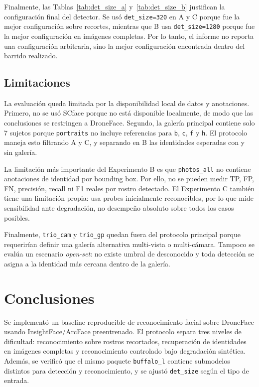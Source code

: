 \documentclass[11pt]{article}
\begin{document}
Finalmente, las Tablas~\ref{tab:det_size_a} y~\ref{tab:det_size_b} justifican la configuración final del detector. Se usó \texttt{det\_size=320} en A y C porque fue la mejor configuración sobre recortes, mientras que B usa \texttt{det\_size=1280} porque fue la mejor configuración en imágenes completas. Por lo tanto, el informe no reporta una configuración arbitraria, sino la mejor configuración encontrada dentro del barrido realizado.

\subsection{Limitaciones}

La evaluación queda limitada por la disponibilidad local de datos y anotaciones. Primero, no se usó SCface porque no está disponible localmente, de modo que las conclusiones se restringen a DroneFace. Segundo, la galería principal contiene solo 7 sujetos porque \texttt{portraits} no incluye referencias para \texttt{b}, \texttt{c}, \texttt{f} y \texttt{h}. El protocolo maneja esto filtrando A y C, y separando en B las identidades esperadas con y sin galería.

La limitación más importante del Experimento B es que \texttt{photos\_all} no contiene anotaciones de identidad por bounding box. Por ello, no se pueden medir TP, FP, FN, precisión, recall ni F1 reales por rostro detectado. El Experimento C también tiene una limitación propia: usa probes inicialmente reconocibles, por lo que mide sensibilidad ante degradación, no desempeño absoluto sobre todos los casos posibles.

Finalmente, \texttt{trio\_cam} y \texttt{trio\_gp} quedan fuera del protocolo principal porque requerirían definir una galería alternativa multi-vista o multi-cámara. Tampoco se evalúa un escenario \textit{open-set}: no existe umbral de desconocido y toda detección se asigna a la identidad más cercana dentro de la galería.

\section{Conclusiones}
\label{sec:conclusiones}

Se implementó un baseline reproducible de reconocimiento facial sobre DroneFace usando InsightFace/ArcFace preentrenado. El protocolo separa tres niveles de dificultad: reconocimiento sobre rostros recortados, recuperación de identidades en imágenes completas y reconocimiento controlado bajo degradación sintética. Además, se verificó que el mismo paquete \texttt{buffalo\_l} contiene submodelos distintos para detección y reconocimiento, y se ajustó \texttt{det\_size} según el tipo de entrada.
\end{document}
